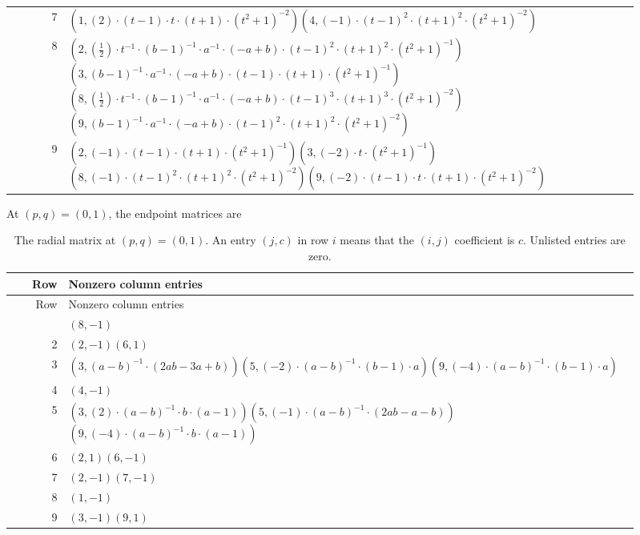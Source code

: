 \begin{longtable}{@{}r>{\raggedright\arraybackslash}p{0.91\linewidth}@{}}
7 & \((1,\left(2\right) \cdot (t - 1) \cdot t \cdot (t + 1) \cdot (t^{2} + 1)^{-2})\)\allowbreak\quad \((4,\left(-1\right) \cdot (t - 1)^{2} \cdot (t + 1)^{2} \cdot (t^{2} + 1)^{-2})\)\\
8 & \((2,\left(\frac{1}{2}\right) \cdot t^{-1} \cdot (b - 1)^{-1} \cdot a^{-1} \cdot (-a + b) \cdot (t - 1)^{2} \cdot (t + 1)^{2} \cdot (t^{2} + 1)^{-1})\)\allowbreak\quad \((3,(b - 1)^{-1} \cdot a^{-1} \cdot (-a + b) \cdot (t - 1) \cdot (t + 1) \cdot (t^{2} + 1)^{-1})\)\allowbreak\quad \((8,\left(\frac{1}{2}\right) \cdot t^{-1} \cdot (b - 1)^{-1} \cdot a^{-1} \cdot (-a + b) \cdot (t - 1)^{3} \cdot (t + 1)^{3} \cdot (t^{2} + 1)^{-2})\)\allowbreak\quad \((9,(b - 1)^{-1} \cdot a^{-1} \cdot (-a + b) \cdot (t - 1)^{2} \cdot (t + 1)^{2} \cdot (t^{2} + 1)^{-2})\)\\
9 & \((2,\left(-1\right) \cdot (t - 1) \cdot (t + 1) \cdot (t^{2} + 1)^{-1})\)\allowbreak\quad \((3,\left(-2\right) \cdot t \cdot (t^{2} + 1)^{-1})\)\allowbreak\quad \((8,\left(-1\right) \cdot (t - 1)^{2} \cdot (t + 1)^{2} \cdot (t^{2} + 1)^{-2})\)\allowbreak\quad \((9,\left(-2\right) \cdot (t - 1) \cdot t \cdot (t + 1) \cdot (t^{2} + 1)^{-2})\)\\
\end{longtable}
\endgroup

At $(p,q)=(0,1)$, the endpoint matrices are

\begingroup\small
\setlength{\tabcolsep}{3pt}
\renewcommand{\arraystretch}{1.16}
\begin{longtable}{@{}r>{\raggedright\arraybackslash}p{0.91\linewidth}@{}}
\caption{The radial matrix at $(p,q)=(0,1)$. An entry $(j,c)$ in row $i$ means that the $(i,j)$ coefficient is $c$. Unlisted entries are zero.}\label{supp:matrix-R_pzero}\\
\toprule Row & Nonzero column entries\\\midrule\endfirsthead
\toprule Row & Nonzero column entries\\\midrule\endhead
\bottomrule\endfoot
1 & \((8,-1)\)\\
2 & \((2,-1)\)\allowbreak\quad \((6,1)\)\\
3 & \((3,(a - b)^{-1} \cdot (2 a b - 3 a + b))\)\allowbreak\quad \((5,\left(-2\right) \cdot (a - b)^{-1} \cdot (b - 1) \cdot a)\)\allowbreak\quad \((9,\left(-4\right) \cdot (a - b)^{-1} \cdot (b - 1) \cdot a)\)\\
4 & \((4,-1)\)\\
5 & \((3,\left(2\right) \cdot (a - b)^{-1} \cdot b \cdot (a - 1))\)\allowbreak\quad \((5,\left(-1\right) \cdot (a - b)^{-1} \cdot (2 a b - a - b))\)\allowbreak\quad \((9,\left(-4\right) \cdot (a - b)^{-1} \cdot b \cdot (a - 1))\)\\
6 & \((2,1)\)\allowbreak\quad \((6,-1)\)\\
7 & \((2,-1)\)\allowbreak\quad \((7,-1)\)\\
8 & \((1,-1)\)\\
9 & \((3,-1)\)\allowbreak\quad \((9,1)\)\\
\end{longtable}
\endgroup

